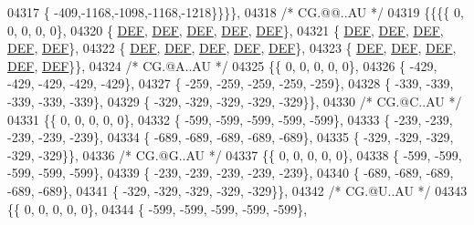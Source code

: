 \begin{DoxyCode}
04317 \{ -409,-1168,-1098,-1168,-1218\}\}\}\},
04318 \textcolor{comment}{/* CG.@@..AU */}
04319 \{\{\{\{    0,    0,    0,    0,    0\},
04320 \{  \mbox{\hyperlink{1_88_84__epars_8h_a397419fc12b37ed479c8abb9d444d843}{DEF}},  \mbox{\hyperlink{1_88_84__epars_8h_a397419fc12b37ed479c8abb9d444d843}{DEF}},  \mbox{\hyperlink{1_88_84__epars_8h_a397419fc12b37ed479c8abb9d444d843}{DEF}},  \mbox{\hyperlink{1_88_84__epars_8h_a397419fc12b37ed479c8abb9d444d843}{DEF}},  \mbox{\hyperlink{1_88_84__epars_8h_a397419fc12b37ed479c8abb9d444d843}{DEF}}\},
04321 \{  \mbox{\hyperlink{1_88_84__epars_8h_a397419fc12b37ed479c8abb9d444d843}{DEF}},  \mbox{\hyperlink{1_88_84__epars_8h_a397419fc12b37ed479c8abb9d444d843}{DEF}},  \mbox{\hyperlink{1_88_84__epars_8h_a397419fc12b37ed479c8abb9d444d843}{DEF}},  \mbox{\hyperlink{1_88_84__epars_8h_a397419fc12b37ed479c8abb9d444d843}{DEF}},  \mbox{\hyperlink{1_88_84__epars_8h_a397419fc12b37ed479c8abb9d444d843}{DEF}}\},
04322 \{  \mbox{\hyperlink{1_88_84__epars_8h_a397419fc12b37ed479c8abb9d444d843}{DEF}},  \mbox{\hyperlink{1_88_84__epars_8h_a397419fc12b37ed479c8abb9d444d843}{DEF}},  \mbox{\hyperlink{1_88_84__epars_8h_a397419fc12b37ed479c8abb9d444d843}{DEF}},  \mbox{\hyperlink{1_88_84__epars_8h_a397419fc12b37ed479c8abb9d444d843}{DEF}},  \mbox{\hyperlink{1_88_84__epars_8h_a397419fc12b37ed479c8abb9d444d843}{DEF}}\},
04323 \{  \mbox{\hyperlink{1_88_84__epars_8h_a397419fc12b37ed479c8abb9d444d843}{DEF}},  \mbox{\hyperlink{1_88_84__epars_8h_a397419fc12b37ed479c8abb9d444d843}{DEF}},  \mbox{\hyperlink{1_88_84__epars_8h_a397419fc12b37ed479c8abb9d444d843}{DEF}},  \mbox{\hyperlink{1_88_84__epars_8h_a397419fc12b37ed479c8abb9d444d843}{DEF}},  \mbox{\hyperlink{1_88_84__epars_8h_a397419fc12b37ed479c8abb9d444d843}{DEF}}\}\},
04324 \textcolor{comment}{/* CG.@A..AU */}
04325 \{\{    0,    0,    0,    0,    0\},
04326 \{ -429, -429, -429, -429, -429\},
04327 \{ -259, -259, -259, -259, -259\},
04328 \{ -339, -339, -339, -339, -339\},
04329 \{ -329, -329, -329, -329, -329\}\},
04330 \textcolor{comment}{/* CG.@C..AU */}
04331 \{\{    0,    0,    0,    0,    0\},
04332 \{ -599, -599, -599, -599, -599\},
04333 \{ -239, -239, -239, -239, -239\},
04334 \{ -689, -689, -689, -689, -689\},
04335 \{ -329, -329, -329, -329, -329\}\},
04336 \textcolor{comment}{/* CG.@G..AU */}
04337 \{\{    0,    0,    0,    0,    0\},
04338 \{ -599, -599, -599, -599, -599\},
04339 \{ -239, -239, -239, -239, -239\},
04340 \{ -689, -689, -689, -689, -689\},
04341 \{ -329, -329, -329, -329, -329\}\},
04342 \textcolor{comment}{/* CG.@U..AU */}
04343 \{\{    0,    0,    0,    0,    0\},
04344 \{ -599, -599, -599, -599, -599\},

\end{DoxyCode}
